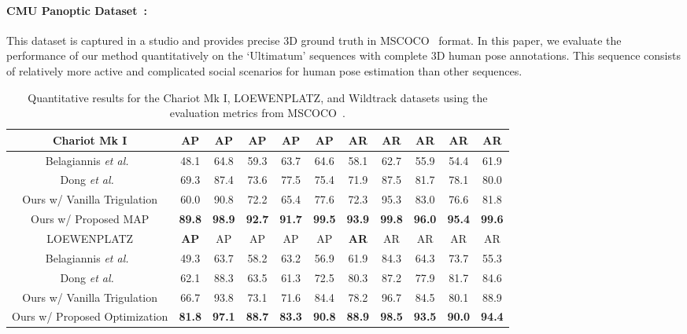 \documentclass[runningheads]{llncs}
\begin{document}
\paragraph{\bf{CMU Panoptic Dataset}~\cite{Authors47}:} This dataset is captured in a studio and provides precise 3D ground truth in MSCOCO~\cite{lin2014microsoft} format. In this paper, we evaluate the performance of our method quantitatively on the `Ultimatum' sequences with complete 3D human pose annotations. This sequence consists of relatively more active and complicated social scenarios for human pose estimation than other sequences. \begin{table*}[!ht]
\centering
\setlength{\tabcolsep}{1.0pt}
\scriptsize
\caption{Quantitative results for the Chariot Mk I, LOEWENPLATZ, and Wildtrack datasets using the evaluation metrics from MSCOCO~\cite{lin2014microsoft}.}
\begin{center}
\begin{tabular}{c|c|cccc|c|cccc} 
\hline
Chariot Mk I &\textbf{AP} & AP & AP & AP &  AP & \textbf{AR} & AR & AR & AR &  AR\\
\hline\hline
Belagiannis \textit{et al.}~\cite{Authors42} & 48.1 & 64.8 & 59.3 & 63.7 & 64.6 & 58.1 & 62.7 & 55.9 & 54.4 &61.9\\
Dong \textit{et al.}~\cite{Authors26} & 69.3 & 87.4 & 73.6 & 77.5 & 75.4 & 71.9 & 87.5 & 81.7 & 78.1 &80.0\\
Ours w/  Vanilla Trigulation & 60.0 & 90.8 & 72.2 & 65.4 & 77.6 & 72.3 & 95.3 & 83.0 & 76.6 & 81.8 \\
Ours w/ Proposed MAP & \textbf{89.8} & \textbf{98.9} & \textbf{92.7} & \textbf{91.7} & \textbf{99.5} & \textbf{93.9} & \textbf{99.8} & \textbf{96.0} & \textbf{95.4} & \textbf{99.6} \\
\hline
LOEWENPLATZ &\textbf{AP} & AP & AP & AP &  AP & \textbf{AR} & AR & AR & AR &  AR\\
\hline\hline
Belagiannis \textit{et al.}~\cite{Authors42}& 49.3 & 63.7 & 58.2 & 63.2 & 56.9 & 61.9 & 84.3 & 64.3 & 73.7 &55.3  \\
Dong \textit{et al.}~\cite{Authors26} & 62.1 & 88.3 & 63.5 & 61.3 & 72.5 & 80.3 & 87.2 & 77.9 & 81.7&84.6\\
Ours w/ Vanilla Trigulation & 66.7 & 93.8 & 73.1 & 71.6 & 84.4 & 78.2 & 96.7 & 84.5 & 80.1 &88.9 \\
Ours w/ Proposed Optimization & \textbf{81.8} & \textbf{97.1} & \textbf{88.7}& \textbf{83.3} & \textbf{90.8} & \textbf{88.9} & \textbf{98.5} & \textbf{93.5} & \textbf{90.0} & \textbf{94.4} \\

\end{tabular}
\end{center}
\end{table*}
\end{document}
